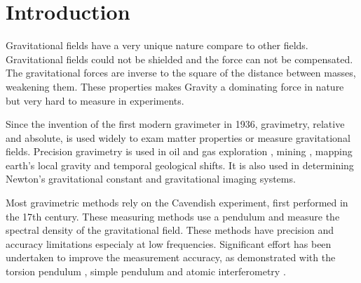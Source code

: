 \documentclass[\main/master.tex]{subfiles}
\begin{document}
\chapter{Introduction}\label{chp:example-1}


Gravitational fields have a very unique nature compare to other fields. Gravitational fields could not be shielded and the force can not be compensated. The gravitational forces are inverse to the square of the distance between masses, weakening them. These properties makes Gravity a dominating force in nature but very hard to measure in experiments.
\par\noindent
Since the invention of the first modern gravimeter in 1936, gravimetry, relative and absolute, is used widely to exam matter properties or measure gravitational fields. Precision gravimetry \cite{Wahr04,Bingham10,Bell98,Leeuwen00,Diorio03,Romaides01,Peters01,Luther82,Kuroda95,Karagioz96,Bagley97,Gundlach00,Quinn01,Armstrong03,Kleinevoss99,Parks10,Peters99,Mcguirk02,Dimopoulos07,Lamporesi08,Sorrentino10,Rosi14,Goodkind99} is used in oil and gas exploration \cite{Bell98}, mining \cite{Leeuwen00}, mapping earth's local gravity \cite{Wahr04,Bingham10} and temporal geological shifts. It is also used in determining Newton's gravitational constant \cite{Luther82, Kuroda95, Karagioz96, Bagley97, Gundlach00, Quinn01, Armstrong03, Kleinevoss99, Parks10, Peters99, Mcguirk02, Dimopoulos07, Lamporesi08, Sorrentino10, Rosi14} and gravitational imaging systems. 
\par\noindent
Most gravimetric methods rely on the Cavendish experiment, first performed in the 17th century. These measuring methods use a pendulum and measure the spectral density of the gravitational field. These methods have precision and accuracy limitations especialy at low frequencies. Significant effort has been undertaken to improve the measurement accuracy, as demonstrated with the torsion pendulum \cite{Luther82,Kuroda95,Karagioz96,Bagley97,Gundlach00,Quinn01,Armstrong03}, simple pendulum \cite {Kleinevoss99,Parks10} and atomic interferometry \cite{Lamporesi08,Sorrentino10,Rosi14}.
\iffalse
\end{document}
